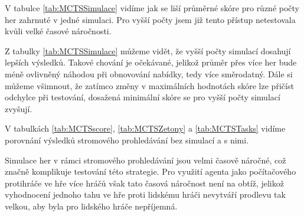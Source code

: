 \tableMCTSBranching

V tabulce \ref{tab:MCTSSimulace} vidíme jak se liší průměrné skóre pro různé počty her zahrnuté v jedné simulaci. Pro vyšší počty jsem již tento přístup netestovala kvůli velké časové náročnosti.

\tableMCTSScore

Z tabulky \ref{tab:MCTSSimulace} můžeme vidět, že vyšší počty simulací dosahují lepších výsledků. Takové chování je očekávané, jelikož průměr přes více her bude méně ovlivněný náhodou při obnovování nabídky, tedy více směrodatný. Dále si můžeme všimnout, že zatímco změny v maximálních hodnotách skóre lze přičíst odchylce při testování, dosažená minimální skóre se pro vyšší počty simulací zvyšují.

V tabulkách \ref{tab:MCTSscore}, \ref{tab:MCTSZetony} a \ref{tab:MCTSTasks} vidíme porovnání výsledků stromového prohledávání bez simulací a s nimi.    

\tableMCTSDetailScore
\tableMCTSDetailButtonsCats
\tableMCTSDetailTasks


 Simulace her v rámci stromového prohledávání jsou velmi časově náročné, což značně komplikuje testování této strategie. Pro využití agenta jako počítačového protihráče ve hře více hráčů však tato časová náročnost není na obtíž, jelikož vyhodnocení jednoho tahu ve hře proti lidskému hráči nevytváří prodlevu tak velkou, aby byla pro lidského hráče nepříjemná.

